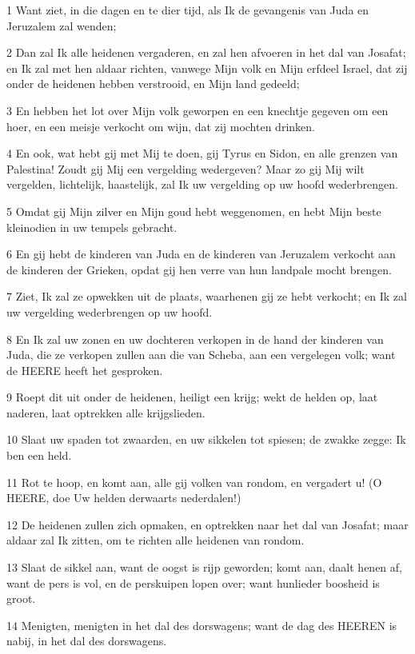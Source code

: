 \par 1 Want ziet, in die dagen en te dier tijd, als Ik de gevangenis van Juda en Jeruzalem zal wenden;
\par 2 Dan zal Ik alle heidenen vergaderen, en zal hen afvoeren in het dal van Josafat; en Ik zal met hen aldaar richten, vanwege Mijn volk en Mijn erfdeel Israel, dat zij onder de heidenen hebben verstrooid, en Mijn land gedeeld;
\par 3 En hebben het lot over Mijn volk geworpen en een knechtje gegeven om een hoer, en een meisje verkocht om wijn, dat zij mochten drinken.
\par 4 En ook, wat hebt gij met Mij te doen, gij Tyrus en Sidon, en alle grenzen van Palestina! Zoudt gij Mij een vergelding wedergeven? Maar zo gij Mij wilt vergelden, lichtelijk, haastelijk, zal Ik uw vergelding op uw hoofd wederbrengen.
\par 5 Omdat gij Mijn zilver en Mijn goud hebt weggenomen, en hebt Mijn beste kleinodien in uw tempels gebracht.
\par 6 En gij hebt de kinderen van Juda en de kinderen van Jeruzalem verkocht aan de kinderen der Grieken, opdat gij hen verre van hun landpale mocht brengen.
\par 7 Ziet, Ik zal ze opwekken uit de plaats, waarhenen gij ze hebt verkocht; en Ik zal uw vergelding wederbrengen op uw hoofd.
\par 8 En Ik zal uw zonen en uw dochteren verkopen in de hand der kinderen van Juda, die ze verkopen zullen aan die van Scheba, aan een vergelegen volk; want de HEERE heeft het gesproken.
\par 9 Roept dit uit onder de heidenen, heiligt een krijg; wekt de helden op, laat naderen, laat optrekken alle krijgslieden.
\par 10 Slaat uw spaden tot zwaarden, en uw sikkelen tot spiesen; de zwakke zegge: Ik ben een held.
\par 11 Rot te hoop, en komt aan, alle gij volken van rondom, en vergadert u! (O HEERE, doe Uw helden derwaarts nederdalen!)
\par 12 De heidenen zullen zich opmaken, en optrekken naar het dal van Josafat; maar aldaar zal Ik zitten, om te richten alle heidenen van rondom.
\par 13 Slaat de sikkel aan, want de oogst is rijp geworden; komt aan, daalt henen af, want de pers is vol, en de perskuipen lopen over; want hunlieder boosheid is groot.
\par 14 Menigten, menigten in het dal des dorswagens; want de dag des HEEREN is nabij, in het dal des dorswagens.
